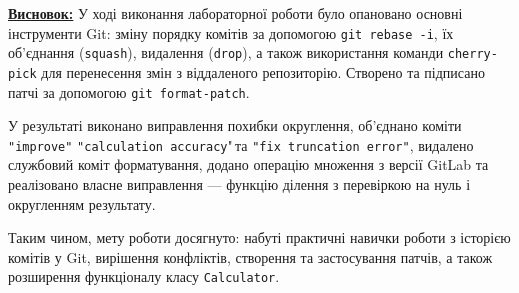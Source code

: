 \documentclass[a4paper,12pt]{article}
\begin{document}
    \textbf{\underline{Висновок:}} У ході виконання лабораторної роботи було опановано основні інструменти Git: 
зміну порядку комітів за допомогою \texttt{git rebase -i}, їх об’єднання (\texttt{squash}), 
видалення (\texttt{drop}), а також використання команди \texttt{cherry-pick} для 
перенесення змін з віддаленого репозиторію. Створено та підписано патчі за допомогою 
\texttt{git format-patch}.

\setlength{\parindent}{1.5em}

У результаті виконано виправлення похибки округлення, об’єднано коміти 
\texttt{"improve"}
\texttt{"calculation accuracy}"\,та \texttt{"fix truncation error"}, видалено службовий 
коміт форматування, додано операцію множення з версії GitLab та реалізовано власне 
виправлення --- функцію ділення з перевіркою на нуль і округленням результату.  

Таким чином, мету роботи досягнуто: набуті практичні навички роботи з історією 
комітів у Git, вирішення конфліктів, створення та застосування патчів, а також 
розширення функціоналу класу \texttt{Calculator}.

\newpage
\end{document}
